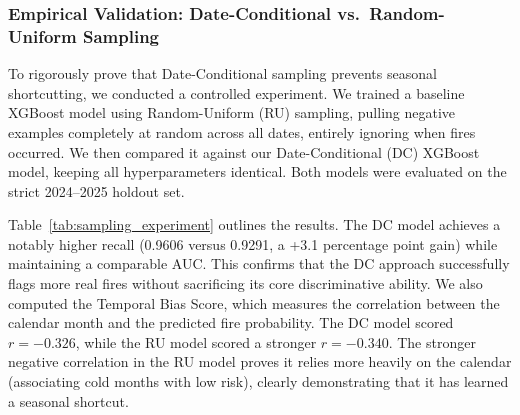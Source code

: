 \documentclass[11pt]{article}
\begin{document}
\subsubsection{Empirical Validation: Date-Conditional vs.\ Random-Uniform Sampling}
\label{sec:sampling_experiment}

To rigorously prove that Date-Conditional sampling prevents seasonal shortcutting, we conducted a controlled experiment. We trained a baseline XGBoost model using Random-Uniform (RU) sampling, pulling negative examples completely at random across all dates, entirely ignoring when fires occurred. We then compared it against our Date-Conditional (DC) XGBoost model, keeping all hyperparameters identical. Both models were evaluated on the strict 2024--2025 holdout set.

Table~\ref{tab:sampling_experiment} outlines the results. The DC model achieves a notably higher recall (0.9606 versus 0.9291, a +3.1 percentage point gain) while maintaining a comparable AUC. This confirms that the DC approach successfully flags more real fires without sacrificing its core discriminative ability. We also computed the Temporal Bias Score, which measures the correlation between the calendar month and the predicted fire probability. The DC model scored $r = -0.326$, while the RU model scored a stronger $r = -0.340$. The stronger negative correlation in the RU model proves it relies more heavily on the calendar (associating cold months with low risk), clearly demonstrating that it has learned a seasonal shortcut.

\begin{table}[H]
\centering
\renewcommand{\arraystretch}{1.25}
\caption{Controlled comparison of Date-Conditional (DC) vs.\ Random-Uniform (RU) negative sampling strategies on the held-out 2024--2025 test set. Both models use XGBoost with identical hyperparameters; only the negative sampling strategy differs. DC achieves significantly higher recall (+3.1 pp), confirming it recovers more true fire events. The smaller absolute value of the month--probability correlation for DC ($|r|=0.326$ vs.\ $0.340$) confirms that the DC model is less dependent on the seasonal prior, i.e.\ it exploits the fire-season calendar shortcut less.}
\label{tab:sampling_experiment}
\end{table}
\end{document}
